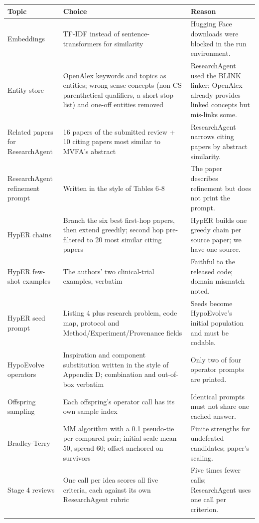 \documentclass[11pt,a4paper]{article}
\begin{document}
\begin{longtable}{@{}P{3.2cm} P{6.6cm} P{5.8cm}@{}}\toprule Topic & Choice & Reason\\\midrule\endhead
Embeddings & TF-IDF instead of sentence-transformers for similarity & Hugging Face downloads were blocked in the run environment.\\\addlinespace[3pt]
Entity store & OpenAlex keywords and topics as entities; wrong-sense concepts (non-CS parenthetical qualifiers, a short stop list) and one-off entities removed & ResearchAgent used the BLINK linker; OpenAlex already provides linked concepts but mis-links some.\\\addlinespace[3pt]
Related papers for ResearchAgent & 16 papers of the submitted review + 10 citing papers most similar to MVFA's abstract & ResearchAgent narrows citing papers by abstract similarity.\\\addlinespace[3pt]
ResearchAgent refinement prompt & Written in the style of Tables 6-8 & The paper describes refinement but does not print the prompt.\\\addlinespace[3pt]
HypER chains & Branch the six best first-hop papers, then extend greedily; second hop pre-filtered to 20 most similar citing papers & HypER builds one greedy chain per source paper; we have one source.\\\addlinespace[3pt]
HypER few-shot examples & The authors' two clinical-trial examples, verbatim & Faithful to the released code; domain mismatch noted.\\\addlinespace[3pt]
HypER seed prompt & Listing 4 plus research problem, code map, protocol and Method/Experiment/Provenance fields & Seeds become HypoEvolve's initial population and must be codable.\\\addlinespace[3pt]
HypoEvolve operators & Inspiration and component substitution written in the style of Appendix D; combination and out-of-box verbatim & Only two of four operator prompts are printed.\\\addlinespace[3pt]
Offspring sampling & Each offspring's operator call has its own sample index & Identical prompts must not share one cached answer.\\\addlinespace[3pt]
Bradley-Terry & MM algorithm with a 0.1 pseudo-tie per compared pair; initial scale mean 50, spread 60; offset anchored on survivors & Finite strengths for undefeated candidates; paper's scaling.\\\addlinespace[3pt]
Stage 4 reviews & One call per idea scores all five criteria, each against its own ResearchAgent rubric & Five times fewer calls; ResearchAgent uses one call per criterion.\\\addlinespace[3pt]

\end{longtable}
\end{document}
